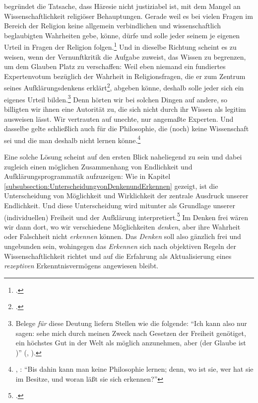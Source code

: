 \label{ThomasiusZuPrivatheitreligioesenBekenntnisses}
begründet die Tatsache, dass Häresie nicht justiziabel ist, mit
dem Mangel an Wissenschaftlichkeit religiöser Behauptungen. Gerade weil es bei
vielen Fragen im Bereich der Religion keine allgemein verbindlichen und
wissenschaftlich beglaubigten Wahrheiten gebe, könne, dürfe und solle jeder
seinem je eigenen Urteil in Fragen der Religion
folgen.\footnote{\cite[Vgl.][\pno~244\,f.]{Albrecht:ChristianThomasius1999}.}
Und in dieselbe Richtung scheint es zu weisen, wenn  der
Vernunftkritik die Aufgabe zuweist, das Wissen zu begrenzen, um dem Glauben
Platz zu verschaffen: Weil eben niemand ein fundiertes Expertenvotum bezüglich
der Wahrheit in Religionsfragen, die er zum Zentrum seines Aufklärungsdenkens
erklärt\footnote{\cite[Vgl.][A
492\,f.,]{Kant:BeantwortungderFrage:WasistAufklaerung?1977} \cite[][VIII:
41.10--22]{Kant:GesammelteWerke1900ff.}.}, abgeben könne, deshalb solle jeder
sich ein eigenes Urteil bilden.\footnote{Belege \emph{für} diese Deutung liefern
Stellen wie die folgende: \enquote{Ich kann also nur sagen:  sehe mich
durch meinen Zweck nach Gesetzen der Freiheit genötiget, ein höchstes Gut in der
Welt als möglich anzunehmen, aber  (der Glaube ist )} (\cite[][A
104]{Kant:ImmanuelKantsLogik1977}, \cite[][IX:
69.22--25]{Kant:GesammelteWerke1900ff.}).} Denn hörten wir bei solchen Dingen
auf andere, so billigten wir ihnen eine Autorität zu, die sich nicht durch ihr
Wissen als legitim ausweisen lässt. Wir vertrauten auf unechte, nur angemaßte
Experten. Und dasselbe gelte schließlich auch für die Philosophie, die (noch)
keine Wissenschaft sei und die man deshalb nicht lernen
könne.\footnote{\cite[Vgl.][B 866]{Kant:KritikderreinenVernunft2003}, \cite[III:
542.12--14]{Kant:GesammelteWerke1900ff.}: \enquote{Bis dahin kann man keine
Philosophie lernen; denn, wo ist sie, wer hat sie im Besitze, und woran läßt sie
sich erkennen?}}

Eine solche Lösung scheint auf den ersten Blick naheliegend zu sein und dabei
zugleich einen möglichen Zusammenhang von Endlichkeit und
Aufklärungsprogrammatik aufzuzeigen: Wie in Kapitel
\ref{subsubsection:UnterscheidungvonDenkenundErkennen} gezeigt, ist die
Unterscheidung von Möglichkeit und Wirklichkeit der zentrale Ausdruck unserer
Endlichkeit. Und diese Unterscheidung wird mitunter als Grundlage unserer
(individuellen) Freiheit und der Aufklärung
interpretiert.\footnote{\cite[Vgl.][283]{Engfer:MenschlicheVernunft2002}.} Im Denken frei wären wir dann dort, wo wir
verschiedene Möglichkeiten \emph{denken}, aber ihre Wahrheit oder Falschheit
nicht \emph{erkennen} können. Das \emph{Denken} soll also gänzlich frei und
ungebunden sein, wohingegen das \emph{Erkennen} sich nach
objektiven Regeln der Wissenschaftlichkeit richtet und auf die Erfahrung als
Aktualisierung eines \emph{rezeptiven} Erkenntnisvermögens angewiesen bleibt.

